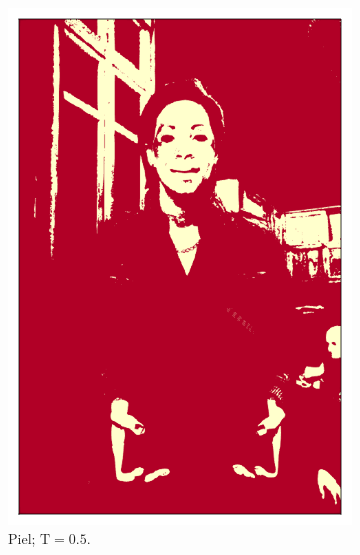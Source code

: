 \begin{figure}[ht!]
\begin{subfigure}[t]{0.2\textwidth}
        \includegraphics[width=\textwidth]{../figures/image2/image_02_treshskin_50percent.png}
        \caption{Piel; $\text{T} = 0.5$.}
    \end{subfigure}
    \hspace{0.25cm}
    \begin{subfigure}[t]{0.2\textwidth}
        \centering

\end{subfigure}
\end{figure}
